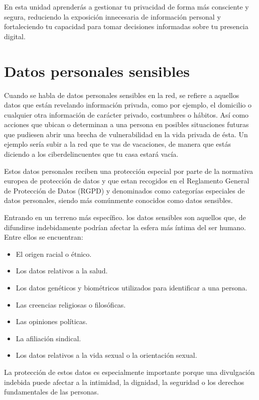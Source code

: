 \documentclass[
  spanish,
  a4paper,
  openany]{book}
\begin{document}
En esta unidad aprenderás a gestionar tu privacidad de forma más consciente y segura, reduciendo la exposición innecesaria de información personal y fortaleciendo tu capacidad para tomar decisiones informadas sobre tu presencia digital.

\section{Datos personales sensibles}\label{datos-personales-sensibles}

Cuando se habla de datos personales sensibles en la red, se refiere a aquellos datos que están revelando información privada, como por ejemplo, el domicilio o cualquier otra información de carácter privado, costumbres o hábitos. Así como acciones que ubican o determinan a una persona en posibles situaciones futuras que pudiesen abrir una brecha de vulnerabilidad en la vida privada de ésta. Un ejemplo sería subir a la red que te vas de vacaciones, de manera que estás diciendo a los ciberdelincuentes que tu casa estará vacía.

Estos datos personales reciben una protección especial por parte de la normativa europea de protección de datos y que estan recogidos en el Reglamento General de Protección de Datos (RGPD) \citep{RGPD} y denominados como categorías especiales de datos personales, siendo más comúnmente conocidos como datos sensibles.

Entrando en un terreno más específico. los datos sensibles son aquellos que, de difundirse indebidamente podrían afectar la esfera más íntima del ser humano. Entre ellos se encuentran:

\begin{itemize}
\item
  El origen racial o étnico.
\item
  Los datos relativos a la salud.
\item
  Los datos genéticos y biométricos utilizados para identificar a una persona.
\item
  Las creencias religiosas o filosóficas.
\item
  Las opiniones políticas.
\item
  La afiliación sindical.
\item
  Los datos relativos a la vida sexual o la orientación sexual.
\end{itemize}

La protección de estos datos es especialmente importante porque una divulgación indebida puede afectar a la intimidad, la dignidad, la seguridad o los derechos fundamentales de las personas.
\end{document}
